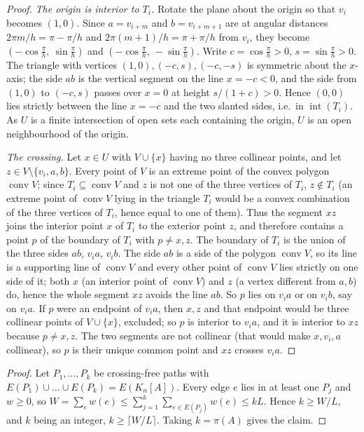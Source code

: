 \documentclass[11pt,a4paper]{article}
\theoremstyle{plain}
\theoremstyle{definition}
\theoremstyle{remark}
\newcommand{\conv}{\operatorname{conv}}
\newcommand{\inte}{\operatorname{int}}
\newcommand{\pipath}{\pi}
\begin{document}
\label{pf:wedge}
\lemwedge*
\begin{proof}
\emph{The origin is interior to $T_i$.} Rotate the plane about the origin so that $v_i$ becomes $(1,0)$. Since $a=v_{i+m}$ and $b=v_{i+m+1}$ are at angular distances $2\pi m/h=\pi-\pi/h$ and $2\pi(m+1)/h=\pi+\pi/h$ from $v_i$, they become $(-\cos\frac\pi h,\ \sin\frac\pi h)$ and $(-\cos\frac\pi h,\ -\sin\frac\pi h)$. Write $c=\cos\frac\pi h>0$, $s=\sin\frac\pi h>0$. The triangle with vertices $(1,0),(-c,s),(-c,-s)$ is symmetric about the $x$-axis; the side $ab$ is the vertical segment on the line $x=-c<0$, and the side from $(1,0)$ to $(-c,s)$ passes over $x=0$ at height $s/(1+c)>0$. Hence $(0,0)$ lies strictly between the line $x=-c$ and the two slanted sides, i.e.\ in $\inte(T_i)$. As $U$ is a finite intersection of open sets each containing the origin, $U$ is an open neighbourhood of the origin.

\emph{The crossing.} Let $x\in U$ with $V\cup\{x\}$ having no three collinear points, and let $z\in V\setminus\{v_i,a,b\}$. Every point of $V$ is an extreme point of the convex polygon $\conv V$; since $T_i\subseteq\conv V$ and $z$ is not one of the three vertices of $T_i$, $z\notin T_i$ (an extreme point of $\conv V$ lying in the triangle $T_i$ would be a convex combination of the three vertices of $T_i$, hence equal to one of them). Thus the segment $xz$ joins the interior point $x$ of $T_i$ to the exterior point $z$, and therefore contains a point $p$ of the boundary of $T_i$ with $p\ne x,z$. The boundary of $T_i$ is the union of the three sides $ab$, $v_ia$, $v_ib$. The side $ab$ is a side of the polygon $\conv V$, so its line is a supporting line of $\conv V$ and every other point of $\conv V$ lies strictly on one side of it; both $x$ (an interior point of $\conv V$) and $z$ (a vertex different from $a,b$) do, hence the whole segment $xz$ avoids the line $ab$. So $p$ lies on $v_ia$ or on $v_ib$, say on $v_ia$. If $p$ were an endpoint of $v_ia$, then $x,z$ and that endpoint would be three collinear points of $V\cup\{x\}$, excluded; so $p$ is interior to $v_ia$, and it is interior to $xz$ because $p\ne x,z$. The two segments are not collinear (that would make $x,v_i,a$ collinear), so $p$ is their unique common point and $xz$ crosses $v_ia$.
\end{proof}

\label{pf:weights}
\lemweights*
\begin{proof}
Let $P_1,\dots,P_k$ be crossing-free paths with $E(P_1)\cup\dots\cup E(P_k)=E(K_n[A])$. Every edge $e$ lies in at least one $P_j$ and $w\ge0$, so $W=\sum_e w(e)\le\sum_{j=1}^k\sum_{e\in E(P_j)}w(e)\le kL$. Hence $k\ge W/L$, and $k$ being an integer, $k\ge\lceil W/L\rceil$. Taking $k=\pipath(A)$ gives the claim.
\end{proof}
\end{document}
